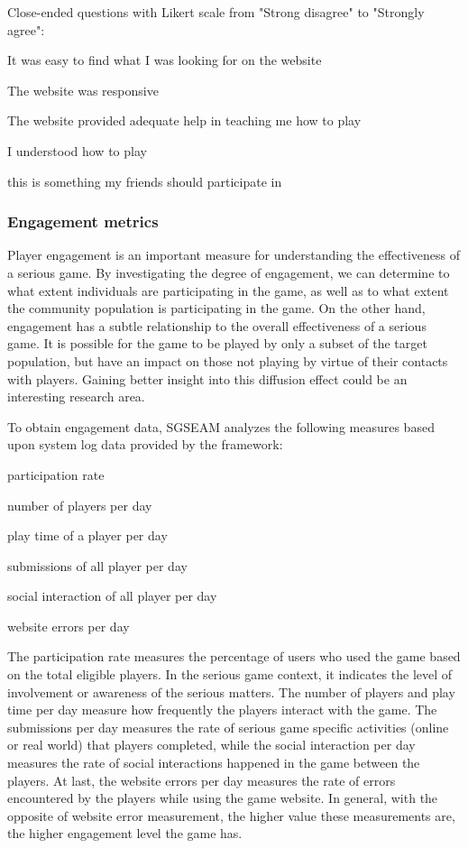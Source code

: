 \documentclass[11pt]{article}
\begin{document}
Close-ended questions with Likert scale from "Strong disagree" to "Strongly agree": 
\begin{compactitem}
\item It was easy to find what I was looking for on the website
\item The website was responsive 
\item The website provided adequate help in teaching me how to play
\item I understood how to play
\item this is something my friends should participate in
\end{compactitem}

\subsubsection{Engagement metrics}
\label{Engagement metrics}

Player engagement is an important measure for understanding the effectiveness of a serious game.
By investigating the degree of engagement, we can determine to what extent individuals are
participating in the game, as well as to what extent the community population is participating in
the game. On the other hand, engagement has a subtle relationship to the overall effectiveness of a 
serious game. It is possible for the game to be played by only a subset of the target population, but
have an impact on those not playing by virtue of their contacts with players. Gaining
better insight into this diffusion effect could be an interesting research area. 

To obtain engagement data, SGSEAM analyzes the following measures
based upon system log data provided by the framework:\\
 
\begin{compactitem}
\item participation rate
\item number of players per day
\item play time of a player per day
\item submissions of all player per day
\item social interaction of all player per day
\item website errors per day\\
\end{compactitem}

The participation rate measures the percentage of users who used the game based on the total
eligible players. In the serious game context, it indicates the level of involvement or awareness
of the serious matters. The number of players and play time per day measure how frequently the
players interact with the game. The submissions per day measures the rate of serious game
specific activities (online or real world) that players completed, while the social interaction
per day measures the rate of social interactions happened in the game between the players. At
last, the website errors per day measures the rate of errors encountered by the players while
using the game website. In general, with the opposite of website error measurement, the higher
value these measurements are, the higher engagement level the game has.
\end{document}
